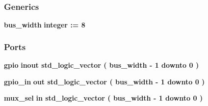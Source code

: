 \subsubsection*{Generics}
 \begin{DoxyCompactItemize}
\item 
{\bf bus\+\_\+width} {\bfseries {\bfseries \textcolor{comment}{integer}\textcolor{vhdlchar}{ }\textcolor{vhdlchar}{ }\textcolor{vhdlchar}{\+:}\textcolor{vhdlchar}{=}\textcolor{vhdlchar}{ }\textcolor{vhdlchar}{ } \textcolor{vhdldigit}{8} \textcolor{vhdlchar}{ }}}
\end{DoxyCompactItemize}
\subsubsection*{Ports}
 \begin{DoxyCompactItemize}
\item 
{\bf gpio}  {\bfseries {\bfseries \textcolor{keywordflow}{inout}\textcolor{vhdlchar}{ }}} {\bfseries \textcolor{comment}{std\+\_\+logic\+\_\+vector}\textcolor{vhdlchar}{ }\textcolor{vhdlchar}{(}\textcolor{vhdlchar}{ }\textcolor{vhdlchar}{ }\textcolor{vhdlchar}{ }\textcolor{vhdlchar}{ }{\bfseries {\bf bus\+\_\+width}} \textcolor{vhdlchar}{-\/}\textcolor{vhdlchar}{ } \textcolor{vhdldigit}{1} \textcolor{vhdlchar}{ }\textcolor{keywordflow}{downto}\textcolor{vhdlchar}{ }\textcolor{vhdlchar}{ } \textcolor{vhdldigit}{0} \textcolor{vhdlchar}{ }\textcolor{vhdlchar}{)}\textcolor{vhdlchar}{ }} 
\item 
{\bf gpio\+\_\+in}  {\bfseries {\bfseries \textcolor{keywordflow}{out}\textcolor{vhdlchar}{ }}} {\bfseries \textcolor{comment}{std\+\_\+logic\+\_\+vector}\textcolor{vhdlchar}{ }\textcolor{vhdlchar}{(}\textcolor{vhdlchar}{ }\textcolor{vhdlchar}{ }\textcolor{vhdlchar}{ }\textcolor{vhdlchar}{ }{\bfseries {\bf bus\+\_\+width}} \textcolor{vhdlchar}{-\/}\textcolor{vhdlchar}{ } \textcolor{vhdldigit}{1} \textcolor{vhdlchar}{ }\textcolor{keywordflow}{downto}\textcolor{vhdlchar}{ }\textcolor{vhdlchar}{ } \textcolor{vhdldigit}{0} \textcolor{vhdlchar}{ }\textcolor{vhdlchar}{)}\textcolor{vhdlchar}{ }} 
\item 
{\bf mux\+\_\+sel}  {\bfseries {\bfseries \textcolor{keywordflow}{in}\textcolor{vhdlchar}{ }}} {\bfseries \textcolor{comment}{std\+\_\+logic\+\_\+vector}\textcolor{vhdlchar}{ }\textcolor{vhdlchar}{(}\textcolor{vhdlchar}{ }\textcolor{vhdlchar}{ }\textcolor{vhdlchar}{ }\textcolor{vhdlchar}{ }{\bfseries {\bf bus\+\_\+width}} \textcolor{vhdlchar}{-\/}\textcolor{vhdlchar}{ } \textcolor{vhdldigit}{1} \textcolor{vhdlchar}{ }\textcolor{keywordflow}{downto}\textcolor{vhdlchar}{ }\textcolor{vhdlchar}{ } \textcolor{vhdldigit}{0} \textcolor{vhdlchar}{ }\textcolor{vhdlchar}{)}\textcolor{vhdlchar}{ }} 

\end{DoxyCompactItemize}
